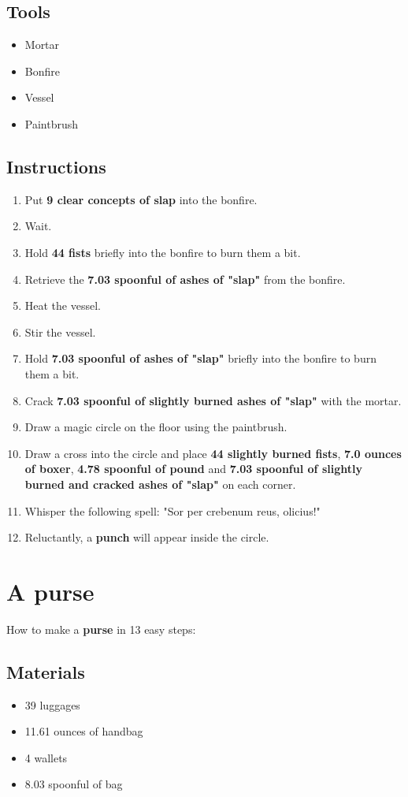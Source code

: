 \documentclass{article}
\begin{document}
\subsection{Tools}\begin{itemize}
\item 
Mortar
\item 
Bonfire
\item 
Vessel
\item 
Paintbrush
\end{itemize}
\subsection{Instructions}\begin{enumerate}
\item 
Put \textbf{9 clear concepts of slap} into the bonfire.
\item 
Wait.
\item 
Hold \textbf{44 fists} briefly into the bonfire to burn them a bit.
\item 
Retrieve the \textbf{7.03 spoonful of ashes of "slap"} from the bonfire.
\item 
Heat the vessel.
\item 
Stir the vessel.
\item 
Hold \textbf{7.03 spoonful of ashes of "slap"} briefly into the bonfire to burn them a bit.
\item 
Crack \textbf{7.03 spoonful of slightly burned ashes of "slap"} with the mortar.
\item 
Draw a magic circle on the floor using the paintbrush.
\item 
Draw a cross into the circle and place \textbf{44 slightly burned fists}, \textbf{7.0 ounces of boxer}, \textbf{4.78 spoonful of pound} and \textbf{7.03 spoonful of slightly burned and cracked ashes of "slap"} on each corner.
\item 
Whisper the following spell: "Sor per crebenum reus, olicius!"
\item 
Reluctantly, a \textbf{punch} will appear inside the circle.
\end{enumerate}
\newpage
\section{A purse}How to make a \textbf{purse} in 13 easy steps:

\subsection{Materials}\begin{itemize}
\item 
39 luggages
\item 
11.61 ounces of handbag
\item 
4 wallets
\item 
8.03 spoonful of bag
\end{itemize}
\end{document}
